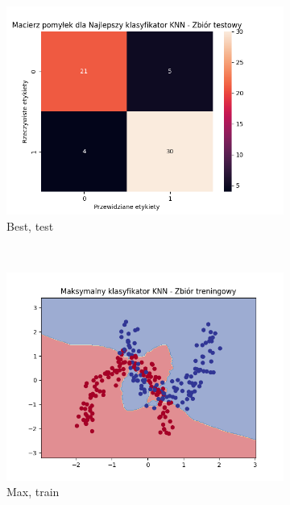 \documentclass[12pt]{article}
\newcommand*{\subfigwidth}{0.15\textwidth}
\begin{document}
\begin{figure}[H]
\begin{subfigure}[t]{\subfigwidth}
        \includegraphics[width=\linewidth]{img/exp_2/knn/2_3/best/test_matrix.png}
        \caption{Best, test}
    \end{subfigure} 
    \\
    \begin{subfigure}[t]{\subfigwidth}
        \includegraphics[width=\linewidth]{img/exp_2/knn/2_3/max/train_boundary.png}
        \caption{Max, train}
    \end{subfigure}
    \hfill
    \begin{subfigure}[t]{\subfigwidth}

\end{subfigure}
\end{figure}
\end{document}
